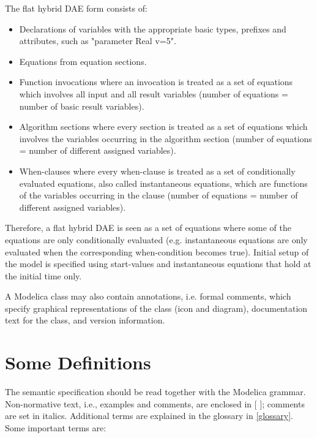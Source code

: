 \documentclass[10pt,a4paper]{report}
\def\doublelabel#1{\label{#1}}
\begin{document}
The flat hybrid DAE form consists of:

\begin{itemize}
\item
  Declarations of variables with the appropriate basic types, prefixes
  and attributes, such as "parameter Real v=5".
\item
  Equations from equation sections.
\item
  Function invocations where an invocation is treated as a set of
  equations which involves all input and all result variables (number of
  equations = number of basic result variables).
\item
  Algorithm sections where every section is treated as a set of
  equations which involves the variables occurring in the algorithm
  section (number of equations = number of different assigned
  variables).
\item
  When-clauses where every when-clause is treated as a set of
  conditionally evaluated equations, also called instantaneous
  equations, which are functions of the variables occurring in the
  clause (number of equations = number of different assigned variables).
\end{itemize}

Therefore, a flat hybrid DAE is seen as a set of equations where some of
the equations are only conditionally evaluated (e.g. instantaneous
equations are only evaluated when the corresponding when-condition
becomes true). Initial setup of the model is specified using
start-values and instantaneous equations that hold at the initial time
only.

A Modelica class may also contain annotations, i.e. formal comments,
which specify graphical representations of the class (icon and diagram),
documentation text for the class, and version information.

\section{Some Definitions}\doublelabel{some-definitions}

The semantic specification should be read together with the Modelica
grammar. Non-normative text, i.e., examples and comments, are enclosed
  in {[} {]}; comments are set in italics. Additional terms are explained
in the glossary in \ref{glossary}. Some important terms are:
\end{document}
